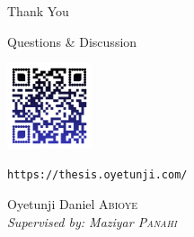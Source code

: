\documentclass[aspectratio=169, 11pt]{beamer}
\begin{document}
\begin{frame}[plain]
    \begin{center}
        \Huge \textcolor{ulblue}{Thank You}
        
        \vspace{0.4cm}
        
        \Large Questions \& Discussion
        
        \vspace{0.4cm}
        
        
        \vspace{0.4cm}
        
        \includegraphics[height=2.5cm]{assets/qr-code.png}
        
        \vspace{0.2cm}
        
        \normalsize \texttt{https://thesis.oyetunji.com/}
        
        \vspace{0.3cm}
        
        \normalsize
        Oyetunji Daniel \textsc{Abioye}\\
        \textit{Supervised by: Maziyar \textsc{Panahi}}
    \end{center}
\end{frame}
\end{document}
